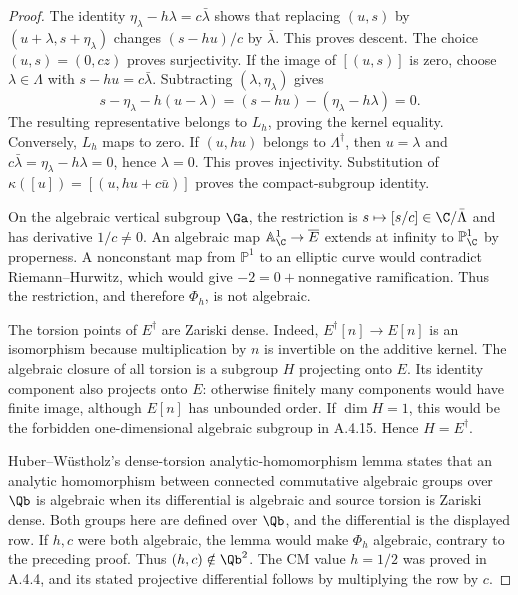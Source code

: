\begin{proof}
The identity
$\eta_\lambda-h\lambda=c\bar\lambda$
shows that replacing $(u,s)$ by $(u+\lambda,s+\eta_\lambda)$
changes $(s-hu)/c$ by $\bar\lambda$. This proves descent.
The choice $(u,s)=(0,cz)$ proves surjectivity.
If the image of $[(u,s)]$ is zero, choose $\lambda\in\Lambda$
with $s-hu=c\bar\lambda$. Subtracting
$(\lambda,\eta_\lambda)$ gives
\[
 s-\eta_\lambda-h(u-\lambda)
 =(s-hu)-(\eta_\lambda-h\lambda)=0.
\]
The resulting representative belongs to $L_h$, proving the
kernel equality. Conversely, $L_h$ maps to zero.
If $(u,hu)$ belongs to $\Lambda^\dagger$, then $u=\lambda$
and $c\bar\lambda=\eta_\lambda-h\lambda=0$, hence $\lambda=0$.
This proves injectivity. Substitution of
$\kappa([u])=[(u,hu+c\bar u)]$ proves the compact-subgroup
identity.

On the algebraic vertical subgroup $\Ga$, the restriction is
$s\mapsto[s/c]\in\C/\bar\Lambda$ and has derivative $1/c\ne0$.
An algebraic map $\mathbb A^1_\C\to\overline E$ extends at
infinity to $\mathbb P^1_\C$ by properness. A nonconstant map
from $\mathbb P^1$ to an elliptic curve would contradict
Riemann--Hurwitz, which would give
$-2=0+\text{nonnegative ramification}$.
Thus the restriction, and therefore $\Phi_h$, is not algebraic.

The torsion points of $E^\dagger$ are Zariski dense.
Indeed, $E^\dagger[n]\to E[n]$ is an isomorphism because
multiplication by $n$ is invertible on the additive kernel.
The algebraic closure of all torsion is a subgroup $H$
projecting onto $E$. Its identity component also projects
onto $E$: otherwise finitely many components would have
finite image, although $E[n]$ has unbounded order.
If $\dim H=1$, this would be the forbidden one-dimensional
algebraic subgroup in A.4.15. Hence $H=E^\dagger$.

Huber--W\"ustholz's dense-torsion analytic-homomorphism
lemma \cite[Lemma 6.5, pp.45--46 of the opened manuscript]{EllHuberWustholz2022}
states that an analytic homomorphism between connected
commutative algebraic groups over $\Qb$ is algebraic when
its differential is algebraic and source torsion is
Zariski dense. Both groups here are defined over $\Qb$,
and the differential is the displayed row.
If $h,c$ were both algebraic, the lemma would make $\Phi_h$
algebraic, contrary to the preceding proof.
Thus $(h,c)\notin\Qb^2$. The CM value $h=1/2$ was proved
in A.4.4, and its stated projective differential follows
by multiplying the row by $c$.
\end{proof}

